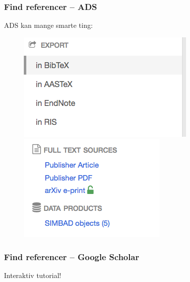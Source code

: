 \documentclass{beamer}
\begin{document}
\begin{frame}
  \frametitle{Find referencer -- ADS}

  ADS kan mange smarte ting:

  \begin{figure}[!h]
    \centering
    \begin{minipage}{.5\textwidth}
      \centering
      \includegraphics[width=.9\linewidth]{figures/ads_eksport}
    \end{minipage}%
    \begin{minipage}{.5\textwidth}
      \centering
      \includegraphics[width=.9\linewidth]{figures/ads_format}
    \end{minipage}
\end{figure}

\end{frame}


\begin{frame}
  \frametitle{Find referencer -- Google Scholar}

  Interaktiv tutorial!

\end{frame}
\end{document}
